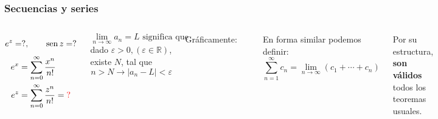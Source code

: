 \documentclass[9pt, aspectratio=169]{beamer}
\begin{document}
\begin{frame}[t]
    \frametitle{Secuencias y series}
 \begin{columns}[t]
     \[ e^z = ?, \qquad \operatorname{sen} z = ? \]
   \begin{align*} 
      e^x &= \sum_{n = 0}^{\infty} \frac{x^n}{n!}  \\
      e^z &= \sum_{n = 0}^{\infty} \frac{z^n}{n!} = \textcolor{red}{?} \\
  \end{align*}
  \begin{definition}
      \vspace{-0.5em}
      \[ \lim_{n \rightarrow \infty} a_n = L \text{ significa que} \]
      dado $\varepsilon > 0, (\varepsilon \in \mathbb{R})$, existe $N$, tal que \vspace{-0.5em}
      \[ n > N \rightarrow |a_n - L| < \varepsilon \]
    
  \end{definition}

    Gráficamente:
    \begin{center}
    \includegraphics[scale=0.35]{figs/fig-11.pdf}
    \end{center}
    En forma similar podemos definir:
    \[ \sum_{n = 1}^{\infty} c_n = \lim_{n \rightarrow \infty} (c_1 + \cdots + c_n) \]

        Por su estructura, \textbf{son válidos} todos los teoremas usuales.


\end{columns}
\end{frame}
\end{document}
